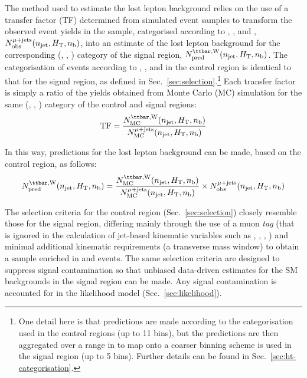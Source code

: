The method used to estimate the lost lepton background relies on the
use of a transfer factor (TF) determined from simulated event samples
to transform the observed event yields in the \mj sample, categorised
according to \njet, \scalht, and \nb, $N_{\textrm{obs}}^{\mu + \textrm{jets}}(n_{\text{jet}}, \mbox{$H_\text{T}$},
n_{\text{b}})$, into an estimate of the lost lepton background for the
corresponding (\njet, \scalht, \nb) category of the signal region,
$\npre^{\ttw}(\njet, \scalht, \nb)$. The categorisation of events
according to \njet, \scalht, and \nb in the \mj control region is
identical to that for the signal region, as defined in
Sec.~\ref{sec:selection}.\footnote{One detail here is that predictions
  are made according to the \scalht categorisation used in the control
  regions (up to 11 bins), but the predictions are then aggregated
  over a range in \scalht to map onto a coarser binning scheme is used
  in the signal region (up to 5 bins). Further details can be found in
  Sec.~\ref{sec:ht-categorisation}.}  Each transfer factor is simply a
ratio of the yields obtained from Monte Carlo (MC) simulation for the
same (\njet, \scalht, \nb) category of the \mj control and signal
regions:
\begin{equation}
  \label{equ:tf-ratio}
  {\rm TF} = \frac{N_{\rm MC}^{\ttw}(\njet, \scalht, \nb)}{N_{\rm MC}^{\mj}(\njet, \scalht, \nb)} 
\end{equation}

In this way, predictions for the lost lepton background can be made,
based on the \mj control region, as follows:
\begin{equation}
  \label{equ:pred-method}
  \npre^{\ttw}(\njet, \scalht, \nb) = 
  \frac{N_{\rm MC}^{\ttw}(\njet, \scalht, \nb)}{N_{\rm MC}^{\mj}(\njet, \scalht, \nb)} 
  \times 
  \nobs^{\mj}(\njet, \scalht, \nb)   
\end{equation}

The selection criteria for the \mj control region
(Sec.~\ref{sec:selection}) closely resemble those for the signal
region, differing mainly through the use of a muon {\it tag} (that is
ignored in the calculation of jet-based kinematic variables such as
\scalht, \mht, \alphat, \etc) and minimal additional kinematic
requirements (\eg a transverse mass window) to obtain a sample
enriched in \wj and \ttbar events. The same selection criteria are
designed to suppress signal contamination so that unbiased data-driven
estimates for the SM backgrounds in the signal region can be
made. Any signal contamination is accounted for in the likelihood
model (Sec.~\ref{sec:likelihood}). 

